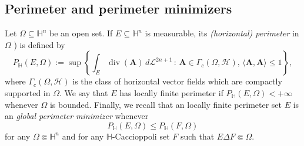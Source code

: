 \documentclass[11pt]{amsart}
\renewcommand{\leq}{\leqslant}
\newcommand{\hhh}{{\mathcal{H}}}
\newcommand{\hn}{\mathbb{H}^n}
\newcommand{\hh}{{\mathbb{H}}}
\newcommand{\Om}{\Omega}
\newcommand{\A}{\mathbf{A}}
\DeclareMathOperator{\divv}{div}
\theoremstyle{definition}
\theoremstyle{remark}
\numberwithin{equation}{section}
\begin{document}
\subsection{Perimeter and perimeter minimizers} Let $\Om\subseteq\hh^n$ be an open set. If $E\subseteq \hn$ is measurable, its \emph{(horizontal) perimeter} in $\Om$ \cite{MR1871966, MR1984849,MR1404326}) is defined by
\begin{equation*}
    P_{\mathbb H}(E,\Om):=\sup\left\{\int_E\divv(\A)\,d\mathcal{L}^{2n+1}\,:\,\A\in \Gamma_c(\Om,\hhh),\,\langle\A,\A\rangle\leq 1\right\},
\end{equation*}
where $\Gamma_c(\Om,\mathcal{H})$ is the class of horizontal vector fields which are compactly supported in $\Om$. We say that $E$ has locally finite perimeter if  $P_{\mathbb H}(E,\Om)<+\infty$ whenever $\Om$ is bounded. Finally, we recall \cite{MR3587666} that an locally finite perimeter set $E$ is an \emph{global perimeter minimizer} whenever
\begin{equation*}
    P_{\mathbb H}(E,\Om)\leq P_{\mathbb H}(F,\Om)
\end{equation*}
for any $\Om \Subset\hn$ and for any $\mathbb H$-Caccioppoli set $F$ such that $E\Delta F\Subset\Om$. 
\end{document}
